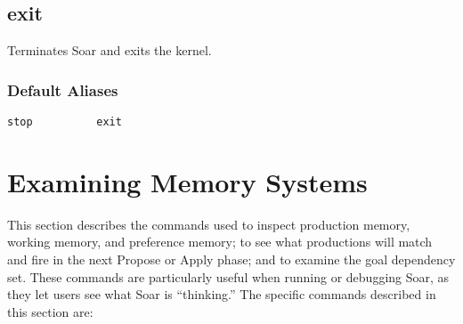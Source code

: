 \divider 
 

\divider
 

\divider


\divider 


\divider 
\subsection{exit}\label{exit}
Terminates Soar and exits the kernel.
\subsubsection{Default Aliases}
\verb|stop          exit|

\divider


\divider 


\section{Examining Memory Systems}
\label{MEMORY}

This section describes the commands used to inspect production memory,
working memory, and preference memory; to see what productions will 
match and fire in the next Propose or Apply phase;  and to examine the 
goal dependency set.  These commands are particularly useful when
running or debugging Soar, as they let users see what Soar is ``thinking.''
The specific commands described in this section are:

